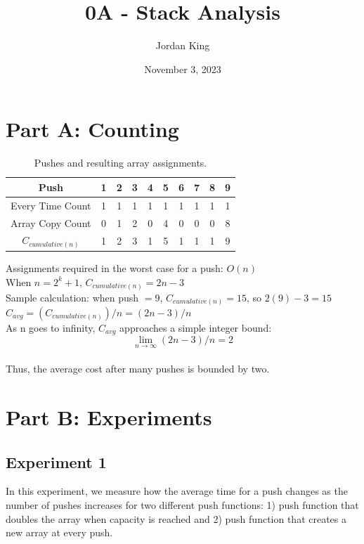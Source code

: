 \documentclass{article}
\title{0A - Stack Analysis}
\author{Jordan King}
\date{November 3, 2023}
\begin{document}
\maketitle

\section{Part A: Counting}

\begin{table}[h!]
\centering
\begin{tabular}{c|c|c|c|c|c|c|c|c|c}
Push & 1 & 2 & 3 & 4 & 5 & 6 & 7 & 8 & 9 \\\hline
Every Time Count & 1 & 1 & 1 & 1 & 1 & 1 & 1 & 1 & 1 \\
Array Copy Count & 0 & 1 & 2 & 0 & 4 & 0 & 0 & 0 & 8 \\
$C_{cumulative (n)}$ & 1 & 2 & 3 & 1 & 5 & 1 & 1 & 1 & 9
\end{tabular}
\caption{\label{tab:widgets}Pushes and resulting array assignments.}
\end{table} 

Assignments required in the worst case for a push: $O(n)$\\

When $n = 2^k + 1$, $C_{cumulative (n)} = 2n - 3$ \\ 

Sample calculation: when push $= 9$, $C_{cumulative (n)} = 15$, so $2(9) - 3 = 15$ \\

$C_{avg} = (C_{cumulative (n)}) / n = (2n - 3) / n$ \\

As n goes to infinity, $C_{avg}$ approaches a simple integer bound: \\

\[ \lim_{n\to\infty} (2n - 3) / n = 2\] \\

Thus, the average cost after many pushes is bounded by two. \\

\section{Part B: Experiments}
\subsection{Experiment 1}
In this experiment, we measure how the average time for a push changes as the number of pushes increases for two different push functions: 1) push function that doubles the array when capacity is reached and 2) push function that creates a new array at every push. \\
\end{document}
